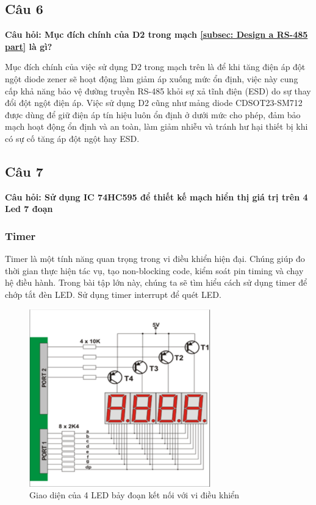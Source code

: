 \subsection{Câu 6}
\textbf{Câu hỏi: Mục đích chính của D2 trong mạch \ref{subsec: Design a RS-485 part} là gì?}

Mục đích chính của việc sử dụng D2 trong mạch trên là để khi tăng điện áp đột ngột diode zener sẽ hoạt động làm giảm áp xuống mức ổn định, việc này cung cấp khả năng bảo vệ đường truyền RS-485 khỏi sự xả tĩnh điện (ESD) do sự thay đổi đột ngột điện áp. Việc sử dụng D2 cũng như mảng diode CDSOT23-SM712 được dùng để giữ điện áp tín hiệu luôn ổn định ở dưới mức cho phép, đảm bảo mạch hoạt động ổn định và an toàn, làm giảm nhiễu và tránh hư hại thiết bị khi có sự cố tăng áp đột ngột hay ESD.
\pagebreak
\subsection{Câu 7}
\textbf{Câu hỏi: Sử dụng IC 74HC595 để thiết kế mạch hiển thị giá trị trên 4 Led 7 đoạn}
\subsubsection{Timer}
Timer là một tính năng quan trọng trong vi điều khiển hiện đại. Chúng giúp đo thời gian thực hiện tác vụ, tạo non-blocking code, kiểm soát pin timing và chạy hệ điều hành. Trong bài tập lớn này, chúng ta sẽ tìm hiểu cách sử dụng timer để chớp tắt đèn LED. Sử dụng timer interrupt để quét LED.
\begin{figure}[ht]
    \centering
    \includegraphics[width=0.7\textwidth]{graphics/LED_7seg.PNG}
    \caption{Giao diện của 4 LED bảy đoạn kết nối với vi điều khiển}
\end{figure}

